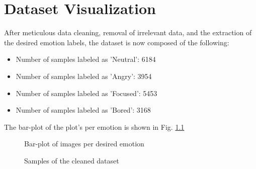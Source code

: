 \documentclass[]{report}
\begin{document}
\chapter{Dataset Visualization}

After meticulous data cleaning, removal of irrelevant data, and the extraction of the desired emotion labels, the dataset is now composed of the following:

\begin{itemize}
	\item Number of samples labeled as 'Neutral': 6184
	\item Number of samples labeled as 'Angry': 3954
	\item Number of samples labeled as 'Focused': 5453
	\item Number of samples labeled as 'Bored': 3168
\end{itemize}

The bar-plot of the plot's per emotion is shown in Fig. \ref{fig:final_count}

\begin{figure}[h]
	\centering
	
	\caption{Bar-plot of images per desired emotion}
		\label{fig:final_count}
\end{figure}
\begin{figure}[h]
	\centering
	\qquad
	\qquad
	\qquad
	
	\caption{Samples of the cleaned dataset}
\end{figure}


 
\end{document}
